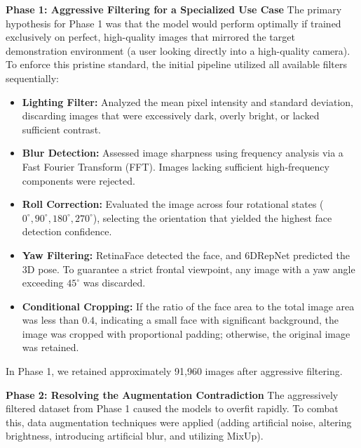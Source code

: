 \textbf{Phase 1: Aggressive Filtering for a Specialized Use Case}
The primary hypothesis for Phase 1 was that the model would perform optimally if trained exclusively on perfect, high-quality images that mirrored the target demonstration environment (a user looking directly into a high-quality camera). To enforce this pristine standard, the initial pipeline utilized all available filters sequentially:
\begin{itemize}
    \item \textbf{Lighting Filter:} Analyzed the mean pixel intensity and standard deviation, discarding images that were excessively dark, overly bright, or lacked sufficient contrast.
    \item \textbf{Blur Detection:} Assessed image sharpness using frequency analysis via a Fast Fourier Transform (FFT). Images lacking sufficient high-frequency components were rejected.
    \item \textbf{Roll Correction:} Evaluated the image across four rotational states ($0^{\circ}, 90^{\circ}, 180^{\circ}, 270^{\circ}$), selecting the orientation that yielded the highest face detection confidence.
    \item \textbf{Yaw Filtering:} RetinaFace detected the face, and 6DRepNet predicted the 3D pose. To guarantee a strict frontal viewpoint, any image with a yaw angle exceeding $45^{\circ}$ was discarded.
    \item \textbf{Conditional Cropping:} If the ratio of the face area to the total image area was less than $0.4$, indicating a small face with significant background, the image was cropped with proportional padding; otherwise, the original image was retained.
\end{itemize}
In Phase 1, we retained approximately 91,960 images after aggressive filtering.

\textbf{Phase 2: Resolving the Augmentation Contradiction}
The aggressively filtered dataset from Phase 1 caused the models to overfit rapidly. To combat this, data augmentation techniques were applied (adding artificial noise, altering brightness, introducing artificial blur, and utilizing MixUp).

